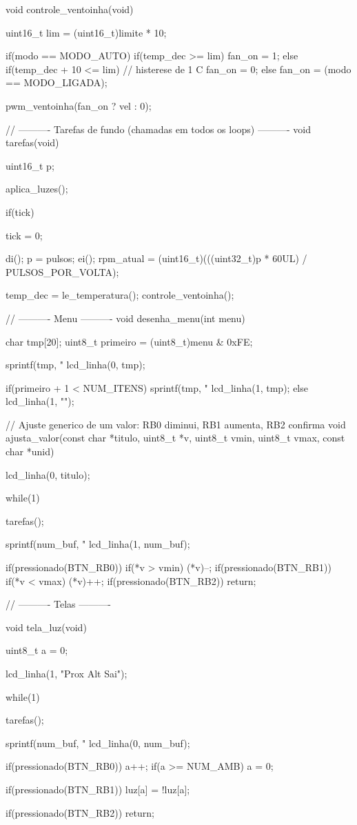 void controle_ventoinha(void)
{
    uint16_t lim = (uint16_t)limite * 10;

    if(modo == MODO_AUTO)
    {
        if(temp_dec >= lim)
            fan_on = 1;
        else if(temp_dec + 10 <= lim)       // histerese de 1 C
            fan_on = 0;
    }
    else
    {
        fan_on = (modo == MODO_LIGADA);
    }

    pwm_ventoinha(fan_on ? vel : 0);
}

// ---------- Tarefas de fundo (chamadas em todos os loops) ----------
void tarefas(void)
{
    uint16_t p;

    aplica_luzes();

    if(tick)
    {
        tick = 0;

        di();
        p = pulsos;
        ei();
        rpm_atual = (uint16_t)(((uint32_t)p * 60UL) / PULSOS_POR_VOLTA);

        temp_dec = le_temperatura();
        controle_ventoinha();
    }
}

// ---------- Menu ----------
void desenha_menu(int menu)
{
    char tmp[20];
    uint8_t primeiro = (uint8_t)menu & 0xFE;

    sprintf(tmp, "%
    lcd_linha(0, tmp);

    if(primeiro + 1 < NUM_ITENS)
    {
        sprintf(tmp, "%
        lcd_linha(1, tmp);
    }
    else
    {
        lcd_linha(1, "");
    }
}

// Ajuste generico de um valor: RB0 diminui, RB1 aumenta, RB2 confirma
void ajusta_valor(const char *titulo, uint8_t *v, uint8_t vmin, uint8_t vmax, const char *unid)
{
    lcd_linha(0, titulo);

    while(1)
    {
        tarefas();

        sprintf(num_buf, "%
        lcd_linha(1, num_buf);

        if(pressionado(BTN_RB0))
        {
            if(*v > vmin) (*v)--;
        }
        if(pressionado(BTN_RB1))
        {
            if(*v < vmax) (*v)++;
        }
        if(pressionado(BTN_RB2))
            return;
    }
}

// ---------- Telas ----------

void tela_luz(void)
{
    uint8_t a = 0;

    lcd_linha(1, "Prox   Alt   Sai");

    while(1)
    {
        tarefas();

        sprintf(num_buf, "%
        lcd_linha(0, num_buf);

        if(pressionado(BTN_RB0))
        {
            a++;
            if(a >= NUM_AMB) a = 0;
        }

        if(pressionado(BTN_RB1))
            luz[a] = !luz[a];

        if(pressionado(BTN_RB2))
            return;
    }
}

